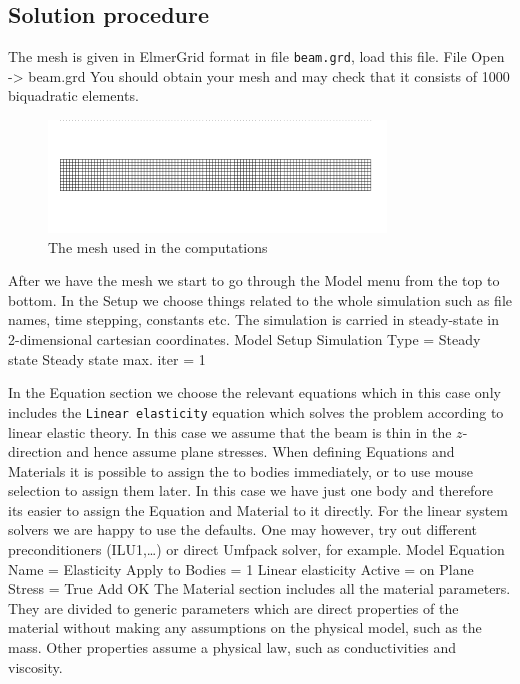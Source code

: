 \subsection*{Solution procedure}

The mesh is given in ElmerGrid format in file \texttt{beam.grd}, load this file.
\ttbegin
File 
  Open -> beam.grd
\ttend
You should obtain your mesh and may check that it consists of 1000 biquadratic elements.
\begin{figure}[h!]
\begin{center}
  \includegraphics[width=0.8\textwidth,viewport=0 30 900 270,clip]{beammesh}
  \caption{The mesh used in the computations}
  \label{fig:elast_mesh}
\end{center}
\end{figure}

After we have the mesh we start to go through the Model menu from the top to bottom. 
In the Setup we choose things related to the whole simulation such as file names, 
time stepping, constants etc.
The simulation is carried in steady-state in 2-dimensional cartesian
coordinates. 
\ttbegin
Model
  Setup 
    Simulation Type = Steady state
    Steady state max. iter = 1
\ttend

In the Equation section we choose the relevant equations which in this case only includes 
the \texttt{Linear elasticity} equation
which solves the problem according to 
linear elastic theory.
In this case we assume that the beam is thin in the $z$-direction and hence assume plane stresses.
When defining Equations and Materials it is possible to assign the to bodies immediately, or to use mouse
selection to assign them later. In this case we have just one body and therefore its easier to assign 
the Equation and Material to it directly.
For the linear system solvers we are happy to use the defaults. One may however, try out different
preconditioners (ILU1,\ldots) or direct Umfpack solver, for example.
\ttbegin
Model
  Equation
    Name = Elasticity
    Apply to Bodies = 1
    Linear elasticity
      Active = on
      Plane Stress = True
    Add 
    OK
\ttend        
The Material section includes all the material parameters.
They are divided to generic parameters which are direct properties of the material
without making any assumptions on the physical model, such as the mass. Other properties assume
a physical law, such as conductivities and viscosity. 

